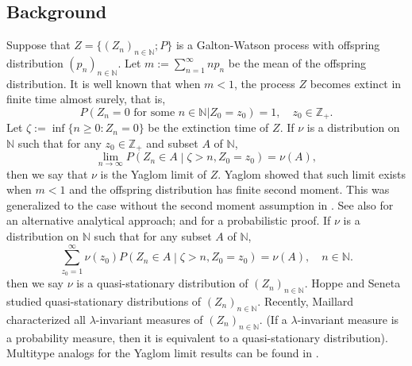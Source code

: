 \documentclass[12pt,a4paper]{amsart}
\numberwithin{equation}{section}
\theoremstyle{plain}
\theoremstyle{definition}
\theoremstyle{remark}
\begin{document}
\subsection{Background}\label{sec:BGD}
	Suppose that $Z=\{(Z_n)_{n\in \mathbb N}; P\}$
	is a Galton-Watson process with offspring distribution
		$(p_n)_{n\in \mathbb N}$.
	Let $m:=\sum^{\infty}_{n=1}np_n$ be the mean
	of the offspring distribution.
	It is well known that when $m<1$,
	the process $Z$ becomes extinct in finite time almost surely, that is,
\[
	P(Z_n = 0 \text{ for some $n \in \mathbb N$} | Z_0 = z_0) = 1, \quad z_0 \in \mathbb Z_+.
\]
	Let $\zeta:=\inf\{n\geq 0: Z_n=0\}$ be the extinction time of $Z$.
If $\nu$ is a distribution on $\mathbb N$ such that for any $z_0\in \mathbb Z_+$ and
	subset $A$ of $\mathbb N$,
\[
	\lim_{n\rightarrow\infty} P\left(Z_n\in A\middle|\zeta>n , Z_0 = z_0\right)=\nu(A),
\]
then we say that $\nu$ is the Yaglom limit of $Z$.
	Yaglom \cite{Yaglom47} showed that such limit exists when $m < 1$ and the offspring distribution has finite second moment.
	This was generalized to the case without the second moment assumption
	in \cite{Heathcote, Joffe1967On}.
	See also \cite[pp. 64--65]{AthreyaNey1972Branching} for an alternative analytical approach; and \cite{LyonsPemantlePeres1995Conceptual} for a probabilistic proof.
	If $\nu$ is a distribution on $\mathbb N$ such that for any subset $A$ of $\mathbb N$,
	\[
	\sum_{z_0 = 1}^\infty \nu(z_0)P\left(Z_n\in A\middle|\zeta>n , Z_0 = z_0\right)=\nu(A), \quad n \in \mathbb N.
	\]
	then we say $\nu$ is a quasi-stationary distribution of $(Z_n)_{n\in \mathbb N}$.
	Hoppe and Seneta \cite{HoppeSeneta1978Analytical} studied
	quasi-stationary distributions of $(Z_n)_{n\in \mathbb N}$.
	Recently, Maillard \cite{Maillard2018The}
characterized all  $\lambda$-invariant measures of $(Z_n)_{n \in \mathbb N}$.
(If a $\lambda$-invariant measure is a probability measure, then it is equivalent to a quasi-stationary distribution).
	Multitype analogs for the Yaglom limit results can be found in
	\cite{Hoppe1975Stationary, HoppeSeneta1978Analytical, JoffeSpitzer1967On}.
\end{document}
